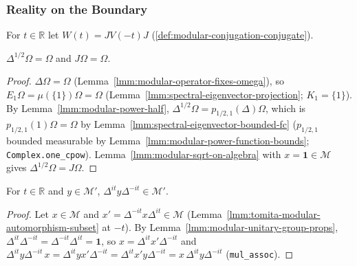 \subsubsection{Reality on the Boundary}

For $t \in \mathbb{R}$ let $W(t) = JV(-t)J$ (\ref{def:modular-conjugation-conjugate}).

\begin{lemma}[$J\Omega = \Omega$]
    \label{lmm:modular-conjugation-fixes-omega}
    \leanok
    $\Delta^{1/2}\Omega = \Omega$ and $J\Omega = \Omega$.
\end{lemma}
\begin{proof}
    \leanok
    $\Delta\Omega = \Omega$ (Lemma~\ref{lmm:modular-operator-fixes-omega}), so $E_1\Omega = \mu(\{1\})\Omega = \Omega$ (Lemma~\ref{lmm:spectral-eigenvector-projection}; $K_1 = \{1\}$). By Lemma~\ref{lmm:modular-power-half}, $\Delta^{1/2}\Omega = p_{1/2,1}(\Delta)\Omega$, which is $p_{1/2,1}(1)\Omega = \Omega$ by Lemma~\ref{lmm:spectral-eigenvector-bounded-fc} ($p_{1/2,1}$ bounded measurable by Lemma~\ref{lmm:modular-power-function-bounds}; \texttt{Complex.one\_cpow}). Lemma~\ref{lmm:modular-sqrt-on-algebra} with $x = \mathbf{1} \in \mathcal{M}$ gives $\Delta^{1/2}\Omega = J\Omega$.
\end{proof}

\begin{lemma}
    \label{lmm:modular-group-preserves-commutant}
    \leanok
    For $t \in \mathbb{R}$ and $y \in \mathcal{M}'$, $\Delta^{it}y\Delta^{-it} \in \mathcal{M}'$.
\end{lemma}
\begin{proof}
    \leanok
    Let $x \in \mathcal{M}$ and $x' = \Delta^{-it}x\Delta^{it} \in \mathcal{M}$ (Lemma~\ref{lmm:tomita-modular-automorphism-subset} at $-t$). By Lemma~\ref{lmm:modular-unitary-group-props}, $\Delta^{it}\Delta^{-it} = \Delta^{-it}\Delta^{it} = \mathbf{1}$, so $x = \Delta^{it}x'\Delta^{-it}$ and $\Delta^{it}y\Delta^{-it}\,x = \Delta^{it}yx'\Delta^{-it} = \Delta^{it}x'y\Delta^{-it} = x\,\Delta^{it}y\Delta^{-it}$ (\texttt{mul\_assoc}).
\end{proof}

